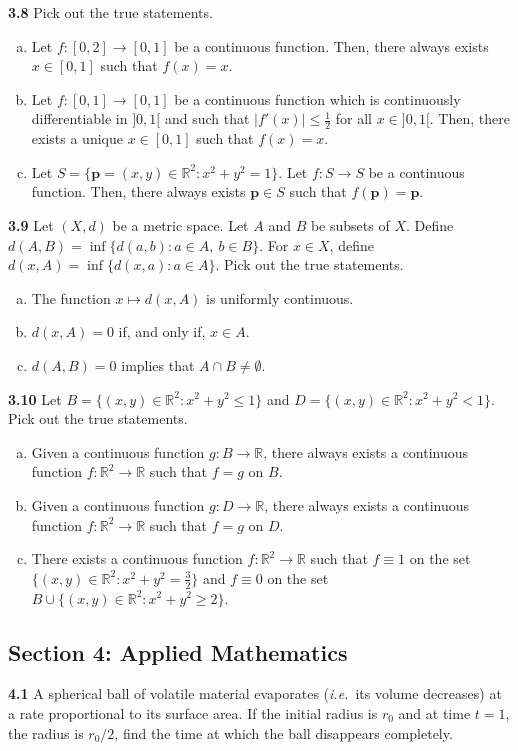 \documentclass[11pt,a4paper]{article}
\newcommand{\R}{\mathbb{R}}
\newcommand{\examsec}[1]{%
  \subsection*{#1}
  \vspace{-2pt}
}
\newcommand{\qitem}[1]{\par\medskip\noindent\textbf{#1}\hspace{0.5em}}
\begin{document}
\qitem{3.8} Pick out the true statements.
\begin{enumerate}[(a)]
  \item Let $f : [0, 2] \to [0, 1]$ be a continuous function. Then, there always exists $x \in [0, 1]$ such that $f(x) = x$.
  \item Let $f : [0, 1] \to [0, 1]$ be a continuous function which is continuously differentiable in $]0, 1[$ and such that $|f'(x)| \le \frac{1}{2}$ for all $x \in ]0, 1[$. Then, there exists a unique $x \in [0, 1]$ such that $f(x) = x$.
  \item Let $S = \{\mathbf{p} = (x, y) \in \R^2 : x^2 + y^2 = 1\}$. Let $f : S \to S$ be a continuous function. Then, there always exists $\mathbf{p} \in S$ such that $f(\mathbf{p}) = \mathbf{p}$.
\end{enumerate}

\qitem{3.9} Let $(X, d)$ be a metric space. Let $A$ and $B$ be subsets of $X$. Define $d(A, B) = \inf\{d(a, b) : a \in A,\ b \in B\}$. For $x \in X$, define $d(x, A) = \inf\{d(x, a) : a \in A\}$. Pick out the true statements.
\begin{enumerate}[(a)]
  \item The function $x \mapsto d(x, A)$ is uniformly continuous.
  \item $d(x, A) = 0$ if, and only if, $x \in A$.
  \item $d(A, B) = 0$ implies that $A \cap B \neq \emptyset$.
\end{enumerate}

\qitem{3.10} Let $B = \{(x, y) \in \R^2 : x^2 + y^2 \le 1\}$ and $D = \{(x, y) \in \R^2 : x^2 + y^2 < 1\}$. Pick out the true statements.
\begin{enumerate}[(a)]
  \item Given a continuous function $g : B \to \R$, there always exists a continuous function $f : \R^2 \to \R$ such that $f = g$ on $B$.
  \item Given a continuous function $g : D \to \R$, there always exists a continuous function $f : \R^2 \to \R$ such that $f = g$ on $D$.
  \item There exists a continuous function $f : \R^2 \to \R$ such that $f \equiv 1$ on the set $\{(x, y) \in \R^2 : x^2 + y^2 = \frac{3}{2}\}$ and $f \equiv 0$ on the set $B \cup \{(x, y) \in \R^2 : x^2 + y^2 \ge 2\}$.
\end{enumerate}

\examsec{Section 4: Applied Mathematics}

\qitem{4.1} A spherical ball of volatile material evaporates (\emph{i.e.}\ its volume decreases) at a rate proportional to its surface area. If the initial radius is $r_0$ and at time $t = 1$, the radius is $r_0/2$, find the time at which the ball disappears completely.
\end{document}
